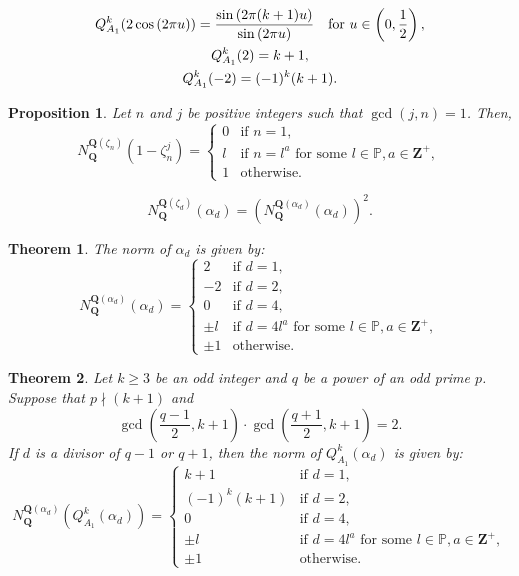 \documentclass[10pt,a4paper]{amsart}
\newtheorem{proposition}{Proposition}
\newtheorem{theorem}{Theorem}
\newcommand{\Q}{\mathbf Q}
\newcommand{\Z}{\mathbf Z}
\newcommand{\cycl}[1]{\Q(\zeta_{#1})}
\newcommand{\norm}[2]{N_{#1}^{#2}}
\begin{document}
\begin{equation}\label{eq:QA1functionaltrigo}
	\begin{gathered}
		Q^k_{A_1}(2\cos{(2\pi u)})=\frac{\sin{(2\pi(k+1)u)}}{\sin{(2\pi u)}} \text{\quad for } u \in \left(0,\frac{1}{2}\right),\\
		Q^k_{A_1}(2)=k+1,\\
		Q^k_{A_1}(-2)=(-1)^k(k+1).
	\end{gathered}
\end{equation}

\begin{proposition}\label{prop:norm}
	Let $n$ and $j$ be positive integers such that $\gcd(j,n)=1$. Then,
	$$
	\norm{\Q}{\cycl{n}}\left(1-\zeta_n^j\right)=
	\begin{cases}
		0 & \text{if } n=1, \\
		l & \text{if } n=l^a \text{ for some } l\in\mathbb{P},  a \in \Z^{+}, \\
		1 & \text{otherwise}.
	\end{cases}
	$$
\end{proposition}

\begin{equation}\label{eq:norminextension}
N_{\Q}^{\cycl{d}}(\alpha_d) = \left( N_{\Q}^{\Q(\alpha_d)}(\alpha_d) \right)^2.	
\end{equation}

\begin{theorem}\label{thm:A1norminput}
The norm of $\alpha_d$ is given by:
\[N_{\Q}^{\Q(\alpha_d)}(\alpha_d) = 
\begin{cases} 
	2 & \text{if } d = 1, \\
	-2 & \text{if } d = 2, \\
	0 & \text{if } d = 4, \\
	\pm l & \text{if } d = 4l^a\text{ for some }l\in\mathbb{P}, a\in\Z^{+},\\
	\pm 1 & \text{otherwise}.
\end{cases}\]
\end{theorem}

\begin{theorem}\label{thm:A1normQ}
Let $k\ge 3$ be an odd integer and $q$ be a power of an odd prime $p$. Suppose that $p\nmid(k+1)$ and $$\gcd\left(\frac{q-1}{2}, k+1\right) \cdot \gcd\left(\frac{q+1}{2}, k+1\right) = 2.$$
If $d$ is a divisor of $q-1$ or $q+1$, then the norm of $Q_{A_1}^k(\alpha_d)$ is given by:
	$$
	N_{\Q}^{\Q(\alpha_d)}\left(Q_{A_1}^k(\alpha_d)\right) = 
	\begin{cases} 
		k+1 & \text{if } d = 1, \\
		(-1)^k(k+1) & \text{if } d = 2, \\
		0 & \text{if } d = 4, \\
		\pm l & \text{if } d = 4l^a\text{ for some }l\in\mathbb{P}, a\in\Z^{+},\\
		\pm 1 & \text{otherwise}.
	\end{cases}
	$$
\end{theorem}
\end{document}
